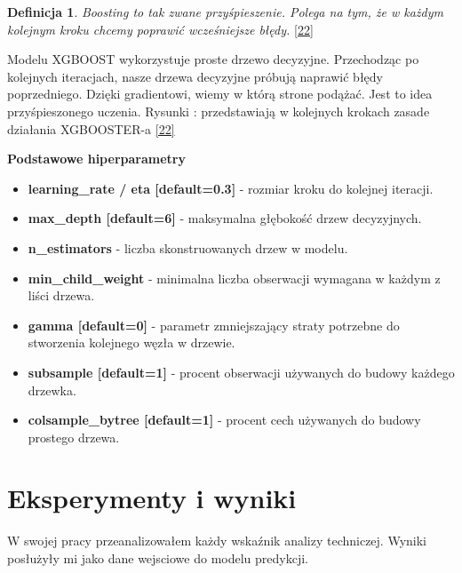 \documentclass[12pt,a4paper,twoside, inzynierska]{pwr_wmat_praca_dyplomowa}
\theoremstyle{plain}
\numberwithin{theorem}{chapter}
\theoremstyle{definition}
\numberwithin{theorem}{chapter}
\newtheorem{definition}[theorem]{Definicja}
\begin{document}
	\begin{definition} 
		\textit{Boosting to tak zwane przyśpieszenie. Polega na tym, że w każdym kolejnym kroku chcemy poprawić wcześniejsze błędy.} \hyperref[info22]{[22]}
	\end{definition}
	
	Modelu XGBOOST wykorzystuje proste drzewo decyzyjne. Przechodząc po kolejnych iteracjach, nasze drzewa decyzyjne próbują naprawić błędy poprzedniego. Dzięki gradientowi, wiemy w którą strone podążać. Jest to idea przyśpieszonego uczenia. Rysunki : przedstawiają w kolejnych krokach zasade działania XGBOOSTER-a  \hyperref[info22]{[22]} \newline
	
	\textbf{Podstawowe hiperparametry}
	\begin{itemize}
		\item \textbf{learning\_rate / eta [default=0.3]} - rozmiar kroku do kolejnej iteracji.
		\item \textbf{max\_depth [default=6]} - maksymalna głębokość drzew decyzyjnych.
		\item \textbf{n\_estimators} - liczba skonstruowanych drzew w modelu.
		\item \textbf{min\_child\_weight} - minimalna liczba obserwacji wymagana w każdym z liści drzewa.
		\item \textbf{gamma [default=0]} - parametr zmniejszający straty potrzebne do stworzenia kolejnego węzła w drzewie.
		\item \textbf{subsample [default=1]} - procent obserwacji używanych do budowy każdego drzewka.
		\item \textbf{colsample\_bytree [default=1]} - procent cech używanych do budowy prostego drzewa.
	\end{itemize}

	\chapter{Eksperymenty i wyniki}
	W swojej pracy przeanalizowałem każdy wskaźnik analizy techniczej. Wyniki posłużyły mi jako dane wejsciowe do modelu predykcji.
	
\end{document}
